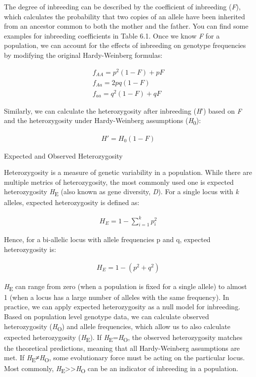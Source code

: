 \documentclass[
]{book}
\begin{document}
The degree of inbreeding can be described by the coefficient of inbreeding (\emph{F}), which calculates the probability that two copies of an allele have been inherited from an ancestor common to both the mother and the father. You can find some examples for inbreeding coefficients in Table 6.1. Once we know \emph{F} for a population, we can account for the effects of inbreeding on genotype frequencies by modifying the original Hardy-Weinberg formulas:

\begin{align} 
f_{AA} = p^2(1-F)+pF \label{eq:30} \\
f_{Aa} = 2pq(1-F) \label{eq:31} \\
f_{aa} = q^2(1-F)+qF \label{eq:32}
\end{align}

Similarly, we can calculate the heterozygosity after inbreeding (\emph{H}') based on \emph{F} and the heterozygosity under Hardy-Weinberg assumptions (\emph{H}\textsubscript{0}):

\begin{align}
H' = H_0(1-F) \label{eq:33}
\end{align}

Expected and Observed Heterozygosity

Heterozygosity is a measure of genetic variability in a population. While there are multiple metrics of heterozygosity, the most commonly used one is expected heterozygosity \emph{H}\textsubscript{E} (also known as gene diversity, \emph{D}). For a single locus with \emph{k} alleles, expected heterozygosity is defined as:

\begin{align} 
H_E = 1-\sum_{i=1}^k p_i^2 \label{eq:34}
\end{align}

Hence, for a bi-allelic locus with allele frequencies p and q, expected heterozygosity is:

\begin{align} 
H_E = 1-(p^2 + q^2) \label{eq:35}
\end{align}

\emph{H}\textsubscript{E} can range from zero (when a population is fixed for a single allele) to almost 1 (when a locus has a large number of alleles with the same frequency). In practice, we can apply expected heterozygosity as a null model for inbreeding. Based on population level genotype data, we can calculate observed heterozygosity (\emph{H}\textsubscript{O}) and allele frequencies, which allow us to also calculate expected heterozygosity (\emph{H}\textsubscript{E}). If \emph{H}\textsubscript{E}=\emph{H}\textsubscript{O}, the observed heterozygosity matches the theoretical predictions, meaning that all Hardy-Weinberg assumptions are met. If \emph{H}\textsubscript{E}≠\emph{H}\textsubscript{O}, some evolutionary force must be acting on the particular locus. Most commonly, \emph{H}\textsubscript{E}\textgreater\textgreater{}\emph{H}\textsubscript{O} can be an indicator of inbreeding in a population.
\end{document}
